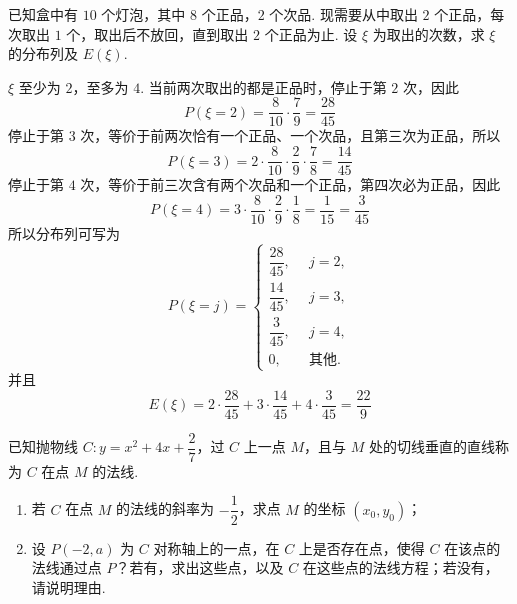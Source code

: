 \begin{problem}
已知盒中有 \(10\) 个灯泡，其中 \(8\) 个正品，\(2\) 个次品. 现需要从中取出 \(2\) 个正品，每次取出 \(1\) 个，取出后不放回，直到取出 \(2\) 个正品为止. 设 \(\xi\) 为取出的次数，求 \(\xi\) 的分布列及 \(E(\xi)\).
\end{problem}

\begin{solution}
\(\xi\) 至少为 \(2\)，至多为 \(4\). 当前两次取出的都是正品时，停止于第 \(2\) 次，因此
\[
P(\xi=2)=\frac8{10}\cdot\frac79=\frac{28}{45}
\]
停止于第 \(3\) 次，等价于前两次恰有一个正品、一个次品，且第三次为正品，所以
\[
P(\xi=3)=2\cdot\frac8{10}\cdot\frac29\cdot\frac78=\frac{14}{45}
\]
停止于第 \(4\) 次，等价于前三次含有两个次品和一个正品，第四次必为正品，因此
\[
P(\xi=4)=3\cdot\frac8{10}\cdot\frac29\cdot\frac18=\frac1{15}=\frac3{45}
\]
所以分布列可写为
\[
P(\xi=j)=
\begin{cases}
\dfrac{28}{45},&\enspace j=2,\\
\dfrac{14}{45},&\enspace j=3,\\
\dfrac3{45},&\enspace j=4,\\
0,&\enspace \text{其他}.
\end{cases}
\]
并且
\[
E(\xi)=2\cdot\frac{28}{45}+3\cdot\frac{14}{45}+4\cdot\frac3{45}=\frac{22}{9}
\]
\end{solution}

\begin{problem}
已知抛物线 \(C:y=x^2+4x+\dfrac27\)，过 \(C\) 上一点 \(M\)，且与 \(M\) 处的切线垂直的直线称为 \(C\) 在点 \(M\) 的法线.
\begin{enumerate}
\item 若 \(C\) 在点 \(M\) 的法线的斜率为 \(-\dfrac12\)，求点 \(M\) 的坐标 \((x_0,y_0)\)；
\item 设 \(P(-2,a)\) 为 \(C\) 对称轴上的一点，在 \(C\) 上是否存在点，使得 \(C\) 在该点的法线通过点 \(P\)？若有，求出这些点，以及 \(C\) 在这些点的法线方程；若没有，请说明理由.
\end{enumerate}
\end{problem}

